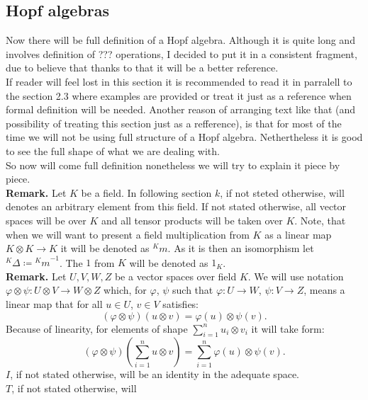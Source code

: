\documentclass[a4paper]{article}
\begin{document}
\subsection{Hopf algebras}
Now there will be full definition of a Hopf algebra. Although it is quite long and involves
definition of ??? operations, I decided to put it in a consistent fragment, due to believe
that thanks to that it will be a better reference. \\
If reader will feel lost in this section it is recommended to read it in parralell to the section 2.3
where examples are provided or treat it just as a reference  when formal definition will be needed.
Another reason of arranging text like that (and possibility of treating this section just as a refference),
is that for most of the time we will not be using full structure of a Hopf algebra. Nethertheless it is good
to see the full shape of what we are dealing with. \\
So now will come full definition nonetheless we will try to explain it piece by piece. \\[8pt]
\indent \textbf{Remark. }Let $K$ be a field. In following section $k$, if not steted otherwise, will
denotes an arbitrary element from this field. If not stated otherwise, all vector spaces will be over $K$ and
all tensor products will be taken over $K$. Note, that when we will want to present a field multiplication
from $K$ as a linear map $K \otimes K \to K$ it will be denoted as ${^Km}$. As it is then an isomorphism
let ${^K\Delta} \coloneqq {^Km}^{-1}$. The $1$ from $K$ will be denoted as $1_K$.\\[8pt]
\indent \textbf{Remark. } Let $U, V, W, Z$ be a vector spaces over field $K$.
We will use notation
$\varphi \otimes \psi:U \otimes V \to W \otimes Z$ which, for
$\varphi$, $\psi$ such that $\varphi : U \to W$, $\psi : V \to Z$, means a linear map that
for all $u \in U$, $v \in V$ satisfies:
\begin{equation*}
(\varphi \otimes \psi)(u \otimes v) = \varphi(u) \otimes \psi(v).
\end{equation*}
Because of linearity, for elements of shape $\displaystyle\sum^n_{i=1} u_i \otimes v_i$ it will take form:
\begin{equation*}
(\varphi \otimes \psi)(\sum^n_{i = 1} u \otimes v) = \sum^n_{i = 1}\varphi(u) \otimes \psi(v).
\end{equation*}
$I$, if not stated otherwise, will be an identity in the adequate space. \\
$T$, if not stated otherwise, will
\end{document}
